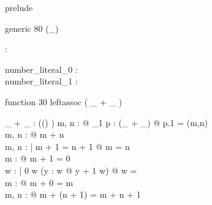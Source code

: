 \zsection prelude\\

\begin{zed}
  generic 80 (\power \_)
\end{zed}

\begin{zed}
  [\arithmos]
\end{zed}

\begin{axdef}
  \nat : \power \arithmos
\end{axdef}

\begin{axdef}
  number\_literal\_0 : \nat\\
  number\_literal\_1 : \nat
\end{axdef}

\begin{zed}
  function 30 leftassoc ( \_ + \_ )
\end{zed}

\begin{axdef}
   \_ + \_ : \power ((\arithmos \cross \arithmos) \cross \arithmos)
\where
   \forall m, n : \nat @ \exists_1 p : (\_ + \_) @ p.1 = (m,n)\\
   \forall m, n : \nat @ m + n \in \nat\\
   \forall m, n : \nat | m + 1 = n + 1 @ m = n\\
   \forall m : \nat @ \lnot m + 1 = 0\\
   \forall w : \power \nat | 0 \in w \land 
         (\forall y : w @ y + 1 \in w) @ w = \nat\\
   \forall m : \nat @ m + 0 = m\\
   \forall m, n : \nat @ m + (n + 1) = m + n + 1
\end{axdef}
